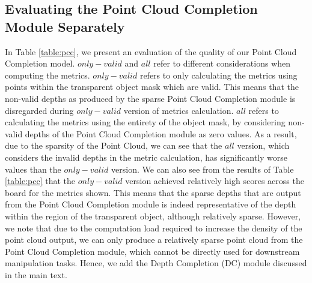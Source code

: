 \subsection{Evaluating the Point Cloud Completion Module Separately}
In Table \ref{table:pcc}, we present an evaluation of the quality of our Point Cloud Completion model. $only-valid$ and $all$ refer to different considerations when computing the metrics. $only-valid$ refers to only calculating the metrics using points within the transparent object mask which are valid. This means that the non-valid depths as produced by the sparse Point Cloud Completion module is disregarded during $only-valid$ version of metrics calculation. $all$ refers to calculating the metrics using the entirety of the object mask, by considering non-valid depths of the Point Cloud Completion module as zero values. As a result, due to the sparsity of the Point Cloud, we can see that the $all$ version, which considers the invalid depths in the metric calculation, has significantly worse values than the $only-valid$ version. We can also see from the results of Table \ref{table:pcc} that the $only-valid$ version achieved relatively high scores across the board for the metrics shown. This means that the sparse depths that are output from the Point Cloud Completion module is indeed representative of the depth within the region of the transparent object, although relatively sparse. However, we note that due to the computation load required to increase the density of the point cloud output, we can only produce a relatively sparse point cloud from the Point Cloud Completion module, which cannot be directly used for downstream manipulation tasks. Hence, we add the Depth Completion (DC) module discussed in the main text.

